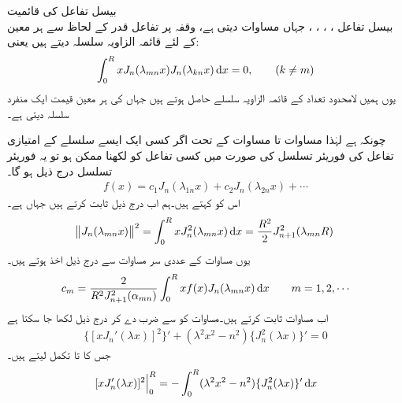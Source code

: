 \quad بیسل تفاعل کی قائمیت\\
بیسل تفاعل ، ، ، ، جہاں  مساوات   دیتی ہے،  وقفہ  پر تفاعل قدر  کے لحاظ سے ہر معین  کے لئے قائمہ الزاویہ سلسلہ دیتے ہیں یعنی:
\begin{align}
\int_0^R xJ_n(\lambda_{mn}x) J_n(\lambda_{kn}x)\dif x=0,\quad \quad (k\ne m)
\end{align}
  یوں ہمیں لامحدود تعداد کے قائمہ الزاویہ سلسلے حاصل ہوتے ہیں جہاں  کی ہر معین قیمت ایک منفرد سلسلہ دیتی ہے۔

چونکہ  ہے لہٰذا مساوات  تا مساوات  کے تحت اگر کسی ایک ایسے سلسلے  کے امتیازی تفاعل  کی فوریئر تسلسل کی صورت میں کسی  تفاعل  کو لکھنا ممکن ہو تو یہ فوریئر تسلسل درج ذیل ہو گا۔
\begin{align}\label{مساوات_طاقتی_فوریئر_بیسل_الف}
f(x)=c_1J_n(\lambda_{1n}x)+c_2J_n(\lambda_{2n}x)+\cdots
\end{align}
اس کو  کہتے ہیں۔ہم اب درج ذیل ثابت کرتے ہیں جہاں  ہے۔
\begin{align}\label{مساوات_طاقتی_فوریئر_بیسل_ب}
\norm{J_n(\lambda_{mn}x)}^2=\int_0^R xJ^2_n(\lambda_{mn}x)\dif x=\frac{R^2}{2}J^2_{n+1}(\lambda_{mn}R)
\end{align} 
یوں مساوات  کے عددی سر  مساوات  سے درج ذیل اخذ ہوتے ہیں۔
 \begin{align}\label{مساوات_طاقتی_فوریئر_بیسل_عددی_سر}
c_m=\frac{2}{R^2J^2_{n+1}(\alpha_{mn})}\int_0^R xf(x)J_n(\lambda_{mn}x)\dif x\quad \quad m=1,2,\cdots
\end{align}
اب مساوات  ثابت کرتے ہیں۔مساوات  کو  سے  ضرب دے کر  درج ذیل لکھا جا سکتا ہے
\begin{align*}
\{[xJ_n'(\lambda x)]^2\}'+(\lambda^2x^2-n^2)\{J_n^2(\lambda x)\}'=0
\end{align*}
جس کا  تا  تکمل لیتے ہیں۔
\begin{align}\label{مساوات_طاقتی_فوریئر_بیسل_پ}
\left.[xJ_n'(\lambda x)]^2\right|_0^R=-\int_0^R(\lambda^2x^2-n^2)\{J_n^2(\lambda x)\}' \dif x
\end{align}
